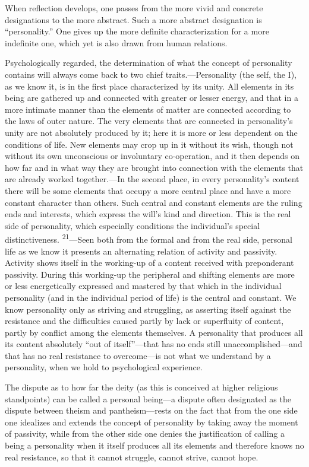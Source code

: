 \documentclass[12pt,a4paper]{book}
\newcommand{\opage}[1]{\marginnote{\footnotesize\textit{[#1]}}}
\begin{document}
When reflection develops, one passes from the more vivid and concrete
designations to the more abstract. Such a more abstract designation is
``personality.'' One gives up the more definite characterization for a more
indefinite one, which yet is also drawn from human relations.

Psychologically regarded, the determination of what the concept of personality
contains will always come back to two chief traits.---Personality (the self,
the I), as we know it, is in the first place characterized by its unity. All
elements in its being are gathered up and connected with greater or lesser
energy, and that in a more intimate manner than the elements of matter are
connected according to the laws of outer nature. The very elements that are
connected in personality's unity are not absolutely produced by it; here it is
more or less dependent on the conditions of life. New elements may crop up in
it without its wish, though not without its own unconscious or involuntary
co-operation, and it then depends on how far and in what way they are brought
into connection with the elements that are already worked together.---In the
second place, in every personality's content there will be some elements that
occupy a more central place and have a more constant character than others.
Such central and constant elements are the ruling ends and interests, which
express the will's kind and direction. This is the real side of personality,
which especially conditions the individual's special distinctiveness.%
\textsuperscript{21}---Seen both from the formal and from the real side,
personal life as we know it presents an alternating relation of activity and
passivity. Activity shows itself in the working-up of a content received with
preponderant passivity. During this working-up the peripheral and shifting
elements are more or less energetically expressed and mastered by that which
in the individual personality (and in the individual period of life) is the
central and constant. We know personality only as striving and struggling, as
asserting itself 
\opage{45}against the resistance and the difficulties caused partly by
lack or superfluity of content, partly by conflict among the elements
themselves. A personality that produces all its content absolutely ``out of
itself''---that has no ends still unaccomplished---and that has no real
resistance to overcome---is not what we understand by a personality, when we
hold to psychological experience.

The dispute as to how far the deity (as this is conceived at higher religious
standpoints) can be called a personal being---a dispute often designated as
the dispute between theism and pantheism---rests on the fact that from the one
side one idealizes and extends the concept of personality by taking away the
moment of passivity, while from the other side one denies the justification of
calling a being a personality when it itself produces all its elements and
therefore knows no real resistance, so that it cannot struggle, cannot strive,
cannot hope.
\end{document}
